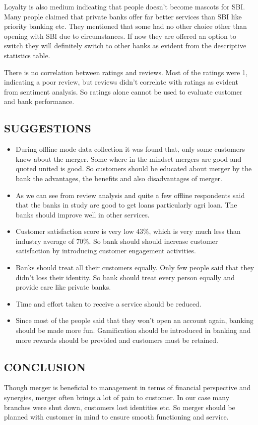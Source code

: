 \documentclass[a4paper, 12pt]{extarticle}
\begin{document}
{Loyalty is also medium indicating that people doesn't become mascots for SBI. Many people claimed that private banks offer far better services than SBI like priority banking etc. They mentioned that some had no other choice other than opening with SBI due to circumstances. If now they are offered an option to switch they will definitely switch to other banks as evident from the descriptive statistics table.

There is no correlation between ratings and reviews. Most of the ratings were 1, indicating a poor review, but reviews didn't correlate with ratings as evident from sentiment analysis. So ratings alone cannot be used to evaluate customer and bank performance.

\subsection{SUGGESTIONS}
\begin{itemize}
\item During offline mode data collection it was found that, only some customers knew about the merger. Some where in the mindset mergers are good and quoted united is good. So customers should be educated about merger by the bank the advantages, the benefits and also disadvantages of merger.
\item As we can see from review analysis and quite a few offline respondents said that the banks in study are good to get loans particularly agri loan. The banks should improve well in other services.
\item Customer satisfaction score is very low 43\%, which is very much less than industry average of 70\%. So bank should should increase customer satisfaction by introducing customer engagement activities.
\item Banks should treat all their customers equally. Only few people said that they didn't loss their identity. So bank should treat every person equally and provide care like private banks.
\item Time and effort taken to receive a service should be reduced.
\item Since most of the people said that they won't open an account again, banking should be made more fun. Gamification should be introduced in banking and more rewards should be provided and customers must be retained.
\end{itemize}
\subsection{CONCLUSION}
Though merger is beneficial to management in terms of financial perspective and synergies, merger often brings a lot of pain to customer. In our case many branches were shut down, customers lost identities etc. So merger should be planned with customer in mind to ensure smooth functioning and service.

}
\end{document}
